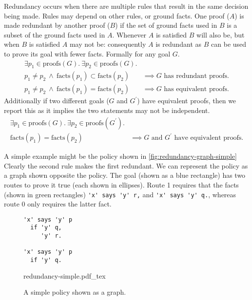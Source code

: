 \documentclass[a4paper]{scrartcl}
\begin{document}
Redundancy occurs when there are multiple rules that result in the same decision being
made.  Rules may depend on other rules, or ground facts.  One proof ($A$) is made
redundant by another proof ($B$) if the set of ground facts used in $B$ is a
subset of the ground facts used in $A$. Whenever $A$ is satisfied $B$ will also
be, but when $B$ is satisfied $A$ may not be: consequently $A$ is redundant as
$B$ can be used to prove its goal with fewer facts.
Formally for any goal $G$.
\begin{align*}
  \exists p_1 \in \text{proofs}(G).~\exists p_2 \in \text{proofs}(G).        & \\
  p_1 \not= p_2~\wedge~\text{facts}(p_1) \subset \text{facts}(p_2)           & \implies G\text{ has redundant proofs.} \\
  p_1 \not= p_2~\wedge~\text{facts}(p_1) = \text{facts}(p_2)                 & \implies G\text{ has equivalent proofs.}
\end{align*}
Additionally if two different goals ($G$ and $G^\prime$) have equivalent proofs, then we report this
as it implies the two statements may not be independent.
\begin{align*}
  \exists p_1 \in \text{proofs}(G).~\exists p_2 \in \text{proofs}(G^\prime). & \\
  \text{facts}(p_1) = \text{facts}(p_2)                                      & \implies \text{$G$ and $G^\prime$ have equivalent proofs.}
\end{align*}


A simple example might be the policy shown in \autoref{fig:redundancy-graph-simple}
Clearly the second rule makes the first redundant.  We can represent the policy
as a graph shown opposite the policy.  The goal (shown as a blue rectangle) has two routes
to prove it true (each shown in ellipses).  Route 1 requires that the facts
(shown in green rectangles) \lstinline!'x' says 'y' r,! and
\lstinline!'x' says 'y' q.!, whereas route 0 only requires the
latter fact.

\begin{figure}
  \centering
  \begin{minipage}{0.4\linewidth}
    \begin{lstlisting}
'x' says 'y' p
  if 'y' q,
     'y' r.

'x' says 'y' p
  if 'y' q.
    \end{lstlisting}
  \end{minipage}
  \begin{minipage}{0.59\linewidth}
    \scriptsize{}
    \def\svgwidth{\columnwidth}
    {redundancy-simple.pdf_tex}
  \end{minipage}
  \caption{A simple policy shown as a graph.}
  \label{fig:redundancy-graph-simple}
\end{figure}
\end{document}
